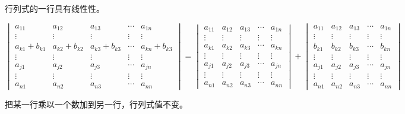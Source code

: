 \begin{corollary}
	行列式的一行具有线性性。
\end{corollary}

$$\begin{vmatrix}
	a_{11} & a_{12} & a_{13} & \cdots & a_{1n}\\
	\vdots & \vdots & \vdots & \vdots & \vdots\\
	a_{k1}+b_{k1} & a_{k2}+b_{k2} & a_{k3}+b_{k3} & \cdots & a_{kn}+b_{k3} \\
	\vdots & \vdots & \vdots & \vdots & \vdots\\
	a_{j1} & a_{j2} & a_{j3} & \cdots & a_{jn}\\
	\vdots & \vdots & \vdots & \vdots & \vdots\\
	a_{n1} & a_{n2} & a_{n3} & \cdots & a_{nn}
\end{vmatrix}=\begin{vmatrix}
	a_{11} & a_{12} & a_{13} & \cdots & a_{1n}\\
	\vdots & \vdots & \vdots & \vdots & \vdots\\
	a_{k1} & a_{k2} & a_{k3} & \cdots & a_{kn}\\
	\vdots & \vdots & \vdots & \vdots & \vdots\\
	a_{j1} & a_{j2} & a_{j3} & \cdots & a_{jn}\\
	\vdots & \vdots & \vdots & \vdots & \vdots\\
	a_{n1} & a_{n2} & a_{n3} & \cdots & a_{nn}
\end{vmatrix}+\begin{vmatrix}
	a_{11} & a_{12} & a_{13} & \cdots & a_{1n}\\
	\vdots & \vdots & \vdots & \vdots & \vdots\\
	b_{k1} & b_{k2} & b_{k3} & \cdots & b_{kn}\\
	\vdots & \vdots & \vdots & \vdots & \vdots\\
	a_{j1} & a_{j2} & a_{j3} & \cdots & a_{jn}\\
	\vdots & \vdots & \vdots & \vdots & \vdots\\
	a_{n1} & a_{n2} & a_{n3} & \cdots & a_{nn}
\end{vmatrix}$$

\begin{corollary}
	把某一行乘以一个数加到另一行，行列式值不变。
\end{corollary}

